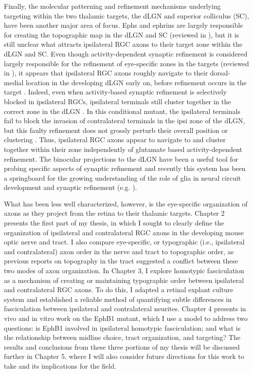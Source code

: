 Finally, the molecular patterning and refinement mechanisms underlying targeting within the two thalamic targets, the dLGN and superior colliculus (SC), have been another major area of focus.
Ephs and ephrins are largely responsible for creating the topographic map in the dLGN and SC (reviewed in ), but it is still unclear what attracts ipsilateral RGC axons to their target zone within the dLGN and SC.
Even though activity-dependent synaptic refinement is considered largely responsible for the refinement of eye-specific zones in the targets (reviewed in ), it appears that ipsilateral RGC axons roughly navigate to their dorsal-medial location in the developing dLGN early on, before refinement occurs in the target \cite{jaubert2005structural}.
Indeed, even when activity-based synaptic refinement is selectively blocked in ipsilateral RGCs, ipsilateral terminals still cluster together in the correct zone in the dLGN \cite{koch2011pathway}.
In this conditional mutant, the ipsilateral terminals fail to block the invasion of contralateral terminals in the ipsi zone of the dLGN, but this faulty refinement does not grossly perturb their overall position or clustering \cite{koch2011pathway}.
Thus, ipsilateral RGC axons appear to navigate to and cluster together within their zone independently of glutamate based activity-dependent refinement.
The binocular projections to the dLGN have been a useful tool for probing specific aspects of synaptic refinement and recently this system has been a springboard for the growing understanding of the role of glia in neural circuit development and synaptic refinement (e.g. ).

What has been less well characterized, however, is the eye-specific organization of axons as they project from the retina to their thalamic targets.
Chapter 2 presents the first part of my thesis, in which I sought to clearly define the organization of ipsilateral and contralateral RGC axons in the developing mouse optic nerve and tract.
I also compare eye-specific, or typographic (i.e., ipsilateral and contralateral) axon order in the nerve and tract to topographic order, as previous reports on topography in the tract suggested a conflict between these two modes of axon organization.
In Chapter 3, I explore homotypic fasciculation as a mechanism of creating or maintaining typographic order between ipsilateral and contralateral RGC axons.
To do this, I adapted a retinal explant culture system and established a reliable method of quantifying subtle differences in fasciculation between ipsilateral and contralateral neurites.
Chapter 4 presents in vivo and in vitro work on the EphB1 mutant, which I use a model to address two questions: is EphB1 involved in ipsilateral homotypic fasciculation; and what is the relationship between midline choice, tract organization, and targeting?
The results and conclusions from these three portions of my thesis will be discussed further in Chapter 5, where I will also consider future directions for this work to take and its implications for the field.

